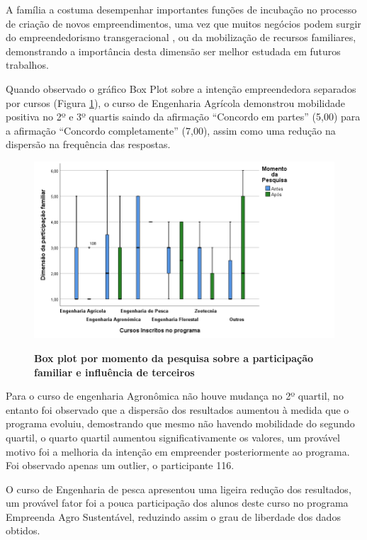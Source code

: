A família a costuma desempenhar importantes funções de incubação no processo de criação de novos empreendimentos, uma vez que muitos negócios podem surgir do empreendedorismo transgeracional \cite{puzi_transgenerational_2020,meliou_family_2020}, ou da mobilização de recursos familiares, demonstrando a importância desta dimensão ser melhor estudada em futuros trabalhos. 

Quando observado o gráfico Box Plot sobre a intenção empreendedora separados por cursos (Figura \ref{boxplotfamilia}), o curso de Engenharia Agrícola demonstrou mobilidade positiva no 2º e 3º quartis saindo da afirmação “Concordo em partes” (5,00) para a afirmação “Concordo completamente” (7,00), assim como uma redução na dispersão na frequência das respostas.  



\begin{figure}[H]
\centering
\caption{\textbf{Box plot  por momento da pesquisa sobre a participação familiar e influência de terceiros}}
\includegraphics[scale=0.4]{Imagens/boxplot_familia.png}
\label{boxplotfamilia}
\end{figure}


Para o curso de engenharia Agronômica não houve mudança no 2º quartil, no entanto foi observado que a dispersão dos resultados aumentou à medida que o programa evoluiu, demostrando que mesmo não havendo mobilidade do segundo quartil, o quarto quartil aumentou significativamente os valores, um provável motivo foi a melhoria da intenção em empreender posteriormente ao programa. Foi observado apenas um outlier, o participante 116.

O curso de Engenharia de pesca apresentou uma ligeira redução dos resultados, um provável fator foi a pouca participação dos alunos deste curso no programa Empreenda Agro Sustentável, reduzindo assim o grau de liberdade dos dados obtidos. 

